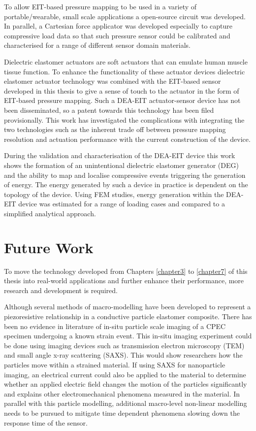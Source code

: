 To allow EIT-based pressure mapping to be used in a variety of portable/wearable, small scale applications a open-source circuit was developed. In parallel, a Cartesian force applicator was developed especially to capture compressive load data so that such pressure sensor could be calibrated and characterised for a range of different sensor domain materials.

Dielectric elastomer actuators are soft actuators that can emulate human muscle tissue function. To enhance the functionality of these actuator devices dielectric elastomer actuator technology was combined with the EIT-based sensor developed in this thesis to give a sense of touch to the actuator in the form of EIT-based pressure mapping. Such a DEA-EIT actuator-sensor device has not been disseminated, so a patent towards this technology has been filed provisionally. This work has investigated the complications with integrating the two technologies such as the inherent trade off between pressure mapping resolution and actuation performance with the current construction of the device.

During the validation and characterisation of the DEA-EIT device this work shows the formation of an unintentional dielectric elastomer generator (DEG) and the ability to map and localise compressive events triggering the generation of energy. The energy generated by such a device in practice is dependent on the topology of the device. Using FEM studies, energy generation within the DEA-EIT device was estimated for a range of loading cases and compared to a simplified analytical approach.



\section{Future Work}
To move the technology developed from Chapters \ref{chapter3} to \ref{chapter7} of this thesis into real-world applications and further enhance their performance, more research and development is required.

Although several methods of macro-modelling have been developed to represent a piezoresistive relationship in a conductive particle elastomer composite. There has been no evidence in literature of in-situ particle scale imaging of a CPEC specimen undergoing a known strain event. This in-situ imaging experiment could be done using imaging devices such as transmission electron microscopy (TEM) and small angle x-ray scattering (SAXS). This would show researchers how the particles move within a strained material. If using SAXS for nanoparticle imaging, an electrical current could also be applied to the material to determine whether an applied electric field changes the motion of the particles significantly and explains other electromechanical phenomena measured in the material. In parallel with this particle modelling, additional macro-level non-linear modelling needs to be pursued to mitigate time dependent phenomena slowing down the response time of the sensor.

